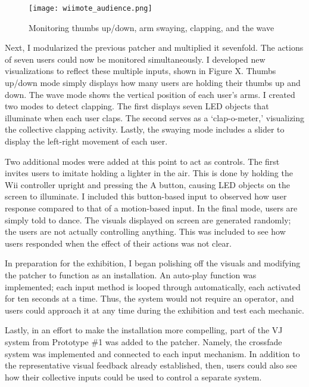\begin{figure}[t]
	\centering

	\texttt{[image: wiimote\_audience.png]}
	\caption{Monitoring thumbs up/down, arm swaying, clapping, and the wave}

	\label{prototyping2.1}
\end{figure}

Next, I modularized the previous patcher and multiplied it sevenfold. The actions of seven users could now be monitored simultaneously. I developed new visualizations to reflect these multiple inputs, shown in Figure X. Thumbs up/down mode simply displays how many users are holding their thumbs up and down. The wave mode shows the vertical position of each user's arms. I created two modes to detect clapping. The first displays seven LED objects that illuminate when each user claps. The second serves as a `clap-o-meter,' visualizing the collective clapping activity. Lastly, the swaying mode includes a slider to display the left-right movement of each user.


Two additional modes were added at this point to act as controls. The first invites users to imitate holding a lighter in the air. This is done by holding the Wii controller upright and pressing the A button, causing LED objects on the screen to illuminate. I included this button-based input to observed how user response compared to that of a motion-based input. In the final mode, users are simply told to dance. The visuals displayed on screen are generated randomly; the users are not actually controlling anything. This was included to see how users responded when the effect of their actions was not clear.

In preparation for the exhibition, I began polishing off the visuals and modifying the patcher to function as an installation. An auto-play function was implemented; each input method is looped through automatically, each activated for ten seconds at a time. Thus, the system would not require an operator, and users could approach it at any time during the exhibition and test each mechanic.

Lastly, in an effort to make the installation more compelling, part of the VJ system from Prototype \#1 was added to the patcher. Namely, the crossfade system was implemented and connected to each input mechanism. In addition to the representative visual feedback already established, then, users could also see how their collective inputs could be used to control a separate system.

